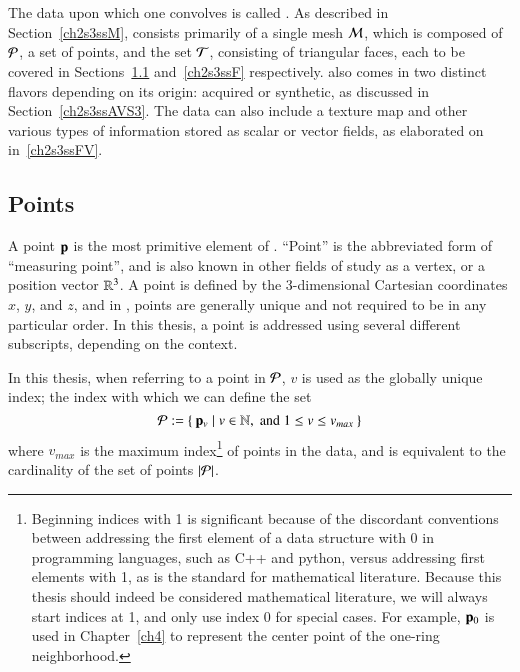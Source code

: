 \section{\tdd}
\label{ch2s3}
The data upon which one convolves  is called \tdd{}. As described in Section~\ref{ch2s3ssM}, \tdd{} consists primarily of a single mesh $\mathcal{M}$, which is composed of $\mathcal{P}$, a set of points, and the set $\mathcal{T}$, consisting of triangular faces, each to be covered in Sections~\ref{ch2s3ssP} and~\ref{ch2s3ssF} respectively. \tdd{} also comes in two distinct flavors depending on its origin: acquired or synthetic, as discussed in Section~\ref{ch2s3ssAVS3}. The data can also include a texture map and other various types of information stored as scalar or vector fields, as elaborated on in~\ref{ch2s3ssFV}.

%
%
%
%
\subsection{Points}
\label{ch2s3ssP}
A point $\mathbf{p}$ is the most primitive element of \tdd{}. ``Point'' is the abbreviated form of ``measuring point'', and is also known in other fields of study as a vertex, or a position vector $\mathbb{R}^{3}$. A point is defined by the 3-dimensional Cartesian coordinates $x$, $y$, and $z$, and in \tdd{}, points are generally unique and not required to be in any particular order. In this thesis, a point is addressed using several different subscripts, depending on the context.

In this thesis, when referring to a point in $\mathcal{P}$, $v$ is used as the globally unique index; the index with which we can define the set
%
\begin{equation}
	\mathcal{P} := \left \{\:\mathbf{p}_v \mid v \in \mathbb{N}, \;\text{and}\; 1\leq v \leq v_{max}\:\right \}
	\label{eq:defineSetOfPoints}
\end{equation}
%
where $v_{max}$ is the maximum index\footnote{\label{indicesFootnote}Beginning indices with 1 is significant because of the discordant conventions between addressing the first element of a data structure with 0 in programming languages, such as C++ and python, versus addressing first elements with 1, as is the standard for mathematical literature. Because this thesis should indeed be considered mathematical literature, we will always start indices at 1, and only use index 0 for special cases. For example, $\mathbf{p}_0$ is used in Chapter~\ref{ch4} to represent the center point of the one-ring neighborhood.} of points in the data, and is equivalent to the cardinality of the set of points $|\mathcal{P}|$.%
%
%

